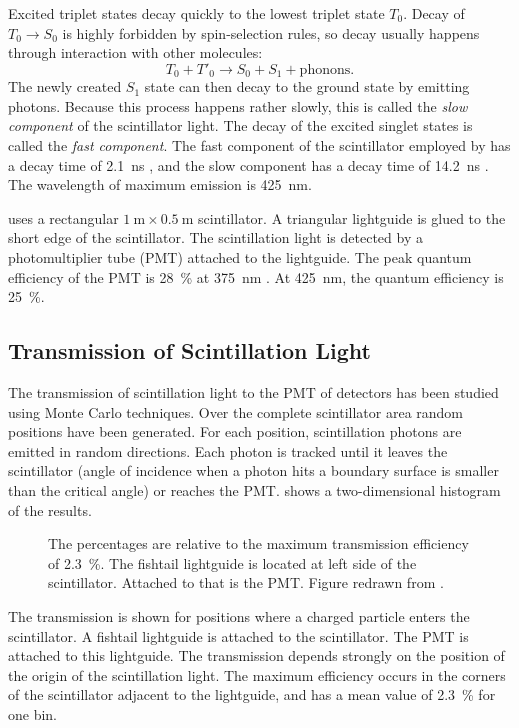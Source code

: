 Excited triplet states decay quickly to the lowest triplet state $T_0$.  Decay
of $T_0 \to S_0$ is highly forbidden by spin-selection rules, so decay usually
happens through interaction with other molecules:
\begin{equation}
T_0 + T'_0 \to S_0 + S_1 + \mathrm{phonons}.
\end{equation}
The newly created $S_1$ state can then decay to the ground state by emitting
photons.  Because this process happens rather slowly, this is called the
\emph{slow component} of the scintillator light.  The decay of the excited
singlet states is called the \emph{fast component}.  The fast component of the
scintillator employed by \hisparc has a decay time of \SI{2.1}{\nano\second}
\cite{BC-408}, and the slow component has a decay time of
\SI{14.2}{\nano\second} \cite{lee:2009}. The wavelength of maximum emission is
\SI{425}{\nano\meter}.

\hisparc uses a rectangular $\SI{1}{\meter}\times\SI{0.5}{\meter}$ scintillator.
A triangular lightguide is glued to the short edge of the scintillator. The
scintillation light is detected by a photomultiplier tube (PMT) attached to
the lightguide. The peak quantum efficiency of the PMT is \SI{28}{\percent} at
\SI{375}{\nano\meter} \cite{9107B}.  At \SI{425}{\nano\meter}, the quantum
efficiency is \SI{25}{\percent}.


\subsection{Transmission of Scintillation Light}
\label{sec:transmission}

The transmission of scintillation light to the PMT of \hisparc detectors has
been studied \cite{Steijger:2010-transmission} using Monte Carlo techniques.
Over the complete scintillator area random positions have been generated.  For
each position, scintillation photons are emitted in random directions.  Each
photon is tracked until it leaves the scintillator (angle of incidence when a
photon hits a boundary surface is smaller than the critical angle) or reaches
the PMT.   shows a two-dimensional
histogram of the results.
\begin{figure}
\centering

\caption{
The percentages are relative to the maximum transmission efficiency of
\SI{2.3}{\percent}.  The fishtail lightguide is located at left side of
the scintillator.  Attached to that is the PMT.  Figure redrawn from
\cite{Steijger:2010-transmission}.}
\label{fig:transmission-contour}
\end{figure}
The transmission is shown for positions where a charged particle enters
the scintillator.  A fishtail lightguide is attached to the scintillator.
The PMT is attached to this lightguide.  The transmission depends strongly
on the position of the origin of the scintillation light.  The maximum
efficiency occurs in the corners of the scintillator adjacent to the
lightguide, and has a mean value of \SI{2.3}{\percent} for one bin.

